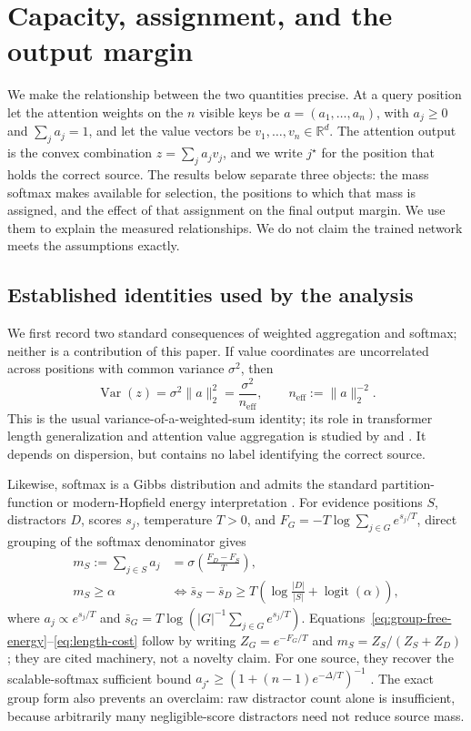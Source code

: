 \documentclass[letterpaper]{article} %
\begin{document}
\section{Capacity, assignment, and the output margin}
\label{sec:analysis}

We make the relationship between the two quantities precise.
At a query position let the attention weights on the $n$ visible keys be $a=(a_1,\dots,a_n)$, with
$a_j\ge 0$ and $\sum_j a_j = 1$, and let the value vectors be $v_1,\dots,v_n\in\mathbb{R}^d$.
The attention output is the convex combination $z=\sum_j a_j v_j$, and we write $j^\star$ for the position
that holds the correct source.
The results below separate three objects: the mass softmax makes available for selection, the positions to
which that mass is assigned, and the effect of that assignment on the final output margin.
We use them to explain the measured relationships.
We do not claim the trained network meets the assumptions exactly.

\subsection{Established identities used by the analysis}

We first record two standard consequences of weighted aggregation and softmax; neither is a contribution of
this paper. If value coordinates are uncorrelated across positions with common variance $\sigma^2$, then
\begin{equation}
\operatorname{Var}(z)=\sigma^2\lVert a\rVert_2^2=\frac{\sigma^2}{n_{\mathrm{eff}}},
\qquad n_{\mathrm{eff}}:=\lVert a\rVert_2^{-2}.
\label{eq:variance-dispersion}
\end{equation}
This is the usual variance-of-a-weighted-sum identity; its role in transformer length generalization and
attention value aggregation is studied by \citet{vanishingvariance} and \citet{attnsink}.
It depends on dispersion, but contains no label identifying the correct source.

Likewise, softmax is a Gibbs distribution and admits the standard partition-function or modern-Hopfield
energy interpretation \citep{ramsauer2021hopfield}.
For evidence positions $S$, distractors $D$, scores $s_j$, temperature $T>0$, and
$F_G=-T\log\sum_{j\in G}e^{s_j/T}$, direct grouping of the softmax denominator gives
\begin{align}
m_S:=\sum_{j\in S}a_j
  &=\sigma\!\left(\frac{F_D-F_S}{T}\right),
  \label{eq:group-free-energy}\\
m_S\ge\alpha
  &\Longleftrightarrow
  \bar s_S-\bar s_D\ge
  T\left(\log\frac{|D|}{|S|}+\operatorname{logit}(\alpha)\right),
  \label{eq:length-cost}
\end{align}
where $a_j\propto e^{s_j/T}$ and
$\bar s_G=T\log(|G|^{-1}\sum_{j\in G}e^{s_j/T})$.
Equations~\ref{eq:group-free-energy}--\ref{eq:length-cost} follow by writing
$Z_G=e^{-F_G/T}$ and $m_S=Z_S/(Z_S+Z_D)$; they are cited machinery, not a novelty claim.
For one source, they recover the scalable-softmax sufficient bound
$a_{j^\star}\ge(1+(n-1)e^{-\Delta/T})^{-1}$ \citep{ssmax}.
The exact group form also prevents an overclaim: raw distractor count alone is insufficient, because
arbitrarily many negligible-score distractors need not reduce source mass.
\end{document}
